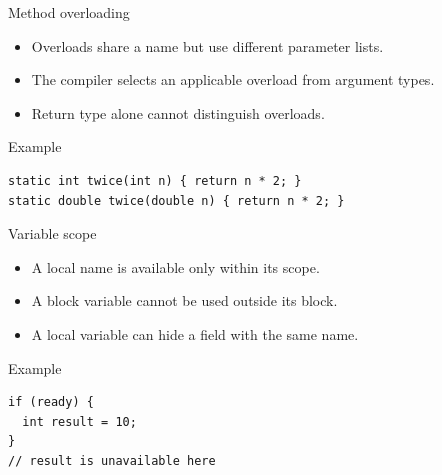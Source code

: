 \documentclass[10pt,aspectratio=169]{beamer}
\begin{document}
\begin{frame}[fragile,t]{Method overloading}
\begin{itemize}
\item Overloads share a name but use different parameter lists.
\item The compiler selects an applicable overload from argument types.
\item Return type alone cannot distinguish overloads.
\end{itemize}
\vspace{1mm}\begin{block}{Example}
\begin{lstlisting}
static int twice(int n) { return n * 2; }
static double twice(double n) { return n * 2; }
\end{lstlisting}
\end{block}
\end{frame}

\begin{frame}[fragile,t]{Variable scope}
\begin{itemize}
\item A local name is available only within its scope.
\item A block variable cannot be used outside its block.
\item A local variable can hide a field with the same name.
\end{itemize}
\vspace{1mm}\begin{block}{Example}
\begin{lstlisting}
if (ready) {
  int result = 10;
}
// result is unavailable here
\end{lstlisting}
\end{block}
\end{frame}
\end{document}
